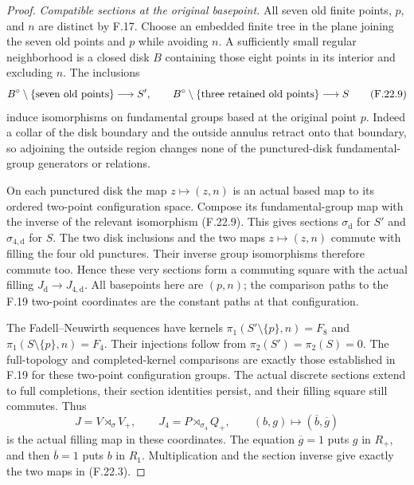 \begin{proof}
\emph{Compatible sections at the original basepoint.}
All seven old finite points, $p$, and $n$ are distinct
by F.17. Choose an embedded finite tree in the plane
joining the seven old points and $p$ while avoiding
$n$. A sufficiently small regular neighborhood is a
closed disk $B$ containing those eight points in its
interior and excluding $n$. The inclusions
\[
 B^\circ\setminus\{\hbox{seven old points}\}\longrightarrow S',
 \qquad
 B^\circ\setminus\{\hbox{three retained old points}\}
                    \longrightarrow S
                                                               \tag{F.22.9}
\]
induce isomorphisms on fundamental groups based at
the original point $p$. Indeed a collar of the disk
boundary and the outside annulus retract onto that
boundary, so adjoining the outside region changes
none of the punctured-disk fundamental-group generators
or relations.

On each punctured disk the map $z\mapsto(z,n)$ is an
actual based map to its ordered two-point configuration
space. Compose its fundamental-group map with the
inverse of the relevant isomorphism (F.22.9).
This gives sections $\sigma_{\mathrm d}$ for $S'$ and
$\sigma_{4,\mathrm d}$ for $S$.
The two disk inclusions and the two maps $z\mapsto(z,n)$
commute with filling the four old punctures. Their
inverse group isomorphisms therefore commute too.
Hence these very sections form a commuting square
with the actual filling $J_{\mathrm d}\to J_{4,\mathrm d}$.
All basepoints here are $(p,n)$; the comparison paths
to the F.19 two-point coordinates are the constant
paths at that configuration.

The Fadell--Neuwirth sequences have kernels
$\pi_1(S'\setminus\{p\},n)=F_8$ and
$\pi_1(S\setminus\{p\},n)=F_4$.
Their injections follow from $\pi_2(S')=\pi_2(S)=0$.
The full-topology and completed-kernel comparisons
are exactly those established in F.19 for these
two-point configuration groups. The actual discrete
sections extend to full completions, their section
identities persist, and their filling square still
commutes. Thus
\[
 J=V\rtimes_\sigma V_+,\qquad
 J_4=P\rtimes_{\sigma_4}Q_+,
 \qquad
 (b,g)\longmapsto(\overline b,\overline g)
                                                               \tag{F.22.10}
\]
is the actual filling map in these coordinates.
The equation $\overline g=1$ puts $g$ in $R_+$,
and then $\overline b=1$ puts $b$ in $R_1$.
Multiplication and the section inverse give exactly
the two maps in (F.22.3).


\end{proof}
